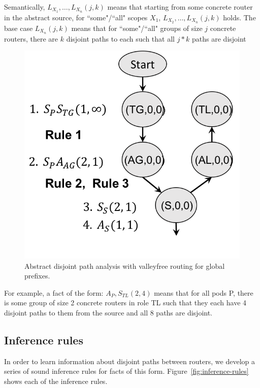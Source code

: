 \documentclass{sig-alternate-10pt}
\begin{document}
Semantically, $L_{X_1}, \ldots, L_{X_n}(j,k)$ means that starting from some concrete router in the abstract source, for ``some"/``all" scopes $X_1$, $L_{X_2}, \ldots, L_{X_n}(j,k)$ holds. The base case $L_{X_n}(j,k)$ means that for ``some"/``all" groups of size $j$ concrete routers, there are $k$ disjoint paths to each such that all $j*k$ paths are disjoint

\begin{figure}
  \begin{center}
    \includegraphics[width=.66\columnwidth]{figures/analysis}
  \end{center}
  \caption{Abstract disjoint path analysis with valleyfree routing for global prefixes. \label{fig:compilation-times}}
  \vspace{-1em}
\end{figure}

For example, a fact of the form: $A_P, S_{TL}(2,4)$ means that for all pods P, there is some group of size 2 concrete routers in role TL such that they each have 4 disjoint paths to them from the source and all 8 paths are disjoint.

\subsection{Inference rules}

In order to learn information about disjoint paths between routers, we develop a series of sound inference rules for facts of this form. Figure~\ref{fig:inference-rules} shows each of the inference rules.


%
%
%
%
\end{document}
